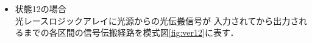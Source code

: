 \begin{itemize}
\item 状態12の場合\\
光レースロジックアレイに光源からの光伝搬信号が
入力されてから出力されるまでの各区間の信号伝搬経路を模式図\ref{fig:ver12}に表す．
\begin{figure}[t!]
\begin{center}
\end{center}
\end{figure}
\end{itemize}
